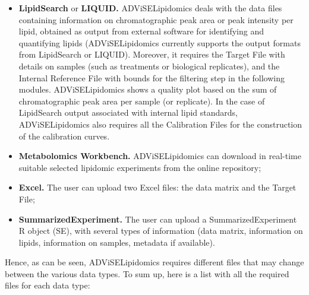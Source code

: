 \documentclass[
]{book}
\providecommand{\tightlist}{%
  \setlength{\itemsep}{0pt}\setlength{\parskip}{0pt}}
\begin{document}
\begin{itemize}
\tightlist
\item
  \textbf{LipidSearch} or \textbf{LIQUID.} ADViSELipidomics deals with the data files containing information on chromatographic peak area or peak intensity per lipid, obtained as output from external software for identifying and quantifying lipids (ADViSELipidomics currently supports the output formats from LipidSearch or LIQUID). Moreover, it requires the Target File with details on samples (such as treatments or biological replicates), and the Internal Reference File with bounds for the filtering step in the following modules. ADViSELipidomics shows a quality plot based on the sum of chromatographic peak area per sample (or replicate). In the case of LipidSearch output associated with internal lipid standards, ADViSELipidomics also requires all the Calibration Files for the construction of the calibration curves.
\item
  \textbf{Metabolomics Workbench.} ADViSELipidomics can download in real-time suitable selected lipidomic experiments from the online repository;
\item
  \textbf{Excel.} The user can upload two Excel files: the data matrix and the Target File;
\item
  \textbf{SummarizedExperiment.} The user can upload a SummarizedExperiment R object (SE), with several types of information (data matrix, information on lipids, information on samples, metadata if available).
\end{itemize}

Hence, as can be seen, ADViSELipidomics requires different files that may change between the various data types. To sum up, here is a list with all the required files for each data type:
\end{document}
